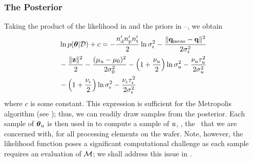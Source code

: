 \subsubsection{The Posterior}
Taking the product of the likelihood in  and the priors in --, we obtain
\begin{align}
  & \ln \f{\vparam | \Data} + c = -\frac{\nrdies \nrprocs \nrsteps}{2} \ln \sigma^2_\noise - \frac{\norm{\mvT_\meas - \mvT}^2}{2 \sigma^2_\noise} \nonumber \\
  & {} - \frac{\norm{\vz}^2}{2} - \frac{(\mu_\u - \mu_0)^2}{2 \sigma^2_0} - \left(1 + \frac{\nu_\u}{2}\right) \ln \sigma^2_\u - \frac{\nu_\u \tau_\u^2}{2 \sigma^2_\u} \nonumber \\
  & {} - \left(1 + \frac{\nu_\noise}{2}\right) \ln \sigma^2_\noise - \frac{\nu_\noise \tau_\noise^2}{2 \sigma^2_\noise} \elabel{log-posterior}
\end{align}
where $c$ is some constant. This expression is sufficient for the Metropolis algorithm (see ); thus, we can readily draw samples from the posterior. Each sample of ${\boldsymbol\theta}_u$ is then used in  to compute a sample of $u$, \ie, the \qoi\ that we are concerned with, for all processing elements on the wafer.
Note, however, the likelihood function poses a significant computational challenge as each sample requires an evaluation of $\model$; we shall address this issue in .
